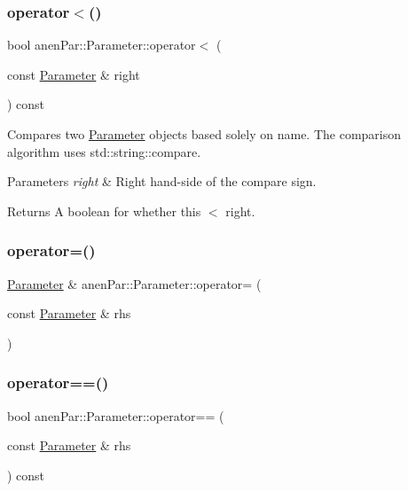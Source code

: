 \subsubsection{\texorpdfstring{operator$<$()}{operator<()}}
{\footnotesize\ttfamily bool anen\+Par\+::\+Parameter\+::operator$<$ (\begin{DoxyParamCaption}\item[{const \mbox{\hyperlink{classanen_par_1_1_parameter}{Parameter}} \&}]{right }\end{DoxyParamCaption}) const}

Compares two \mbox{\hyperlink{classanen_par_1_1_parameter}{Parameter}} objects based solely on name. The comparison algorithm uses std\+::string\+::compare.


\begin{DoxyParams}{Parameters}
{\em right} & Right hand-\/side of the compare sign. \\
\hline
\end{DoxyParams}
\begin{DoxyReturn}{Returns}
A boolean for whether this $<$ right. 
\end{DoxyReturn}
\mbox{\label{classanen_par_1_1_parameter_aebba3af3376eb06f763e3b6d46e68b56}} 
\subsubsection{\texorpdfstring{operator=()}{operator=()}}
{\footnotesize\ttfamily \mbox{\hyperlink{classanen_par_1_1_parameter}{Parameter}} \& anen\+Par\+::\+Parameter\+::operator= (\begin{DoxyParamCaption}\item[{const \mbox{\hyperlink{classanen_par_1_1_parameter}{Parameter}} \&}]{rhs }\end{DoxyParamCaption})}

\mbox{\label{classanen_par_1_1_parameter_a37147dfe637ea7387c4de651e7382606}} 
\subsubsection{\texorpdfstring{operator==()}{operator==()}}
{\footnotesize\ttfamily bool anen\+Par\+::\+Parameter\+::operator== (\begin{DoxyParamCaption}\item[{const \mbox{\hyperlink{classanen_par_1_1_parameter}{Parameter}} \&}]{rhs }\end{DoxyParamCaption}) const}


